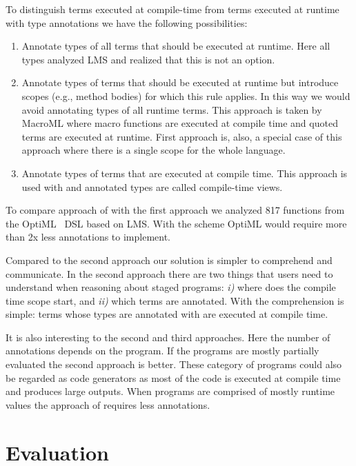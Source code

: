 To distinguish terms executed at compile-time from terms executed at runtime with type annotations we have the following possibilities:
\begin{enumerate}
\item Annotate types of all terms that should be executed at runtime. Here all types analyzed LMS and realized that this is not an option.

\item Annotate types of terms that should be executed at runtime but introduce scopes (e.g., method bodies) for which this rule applies.
In this way we would avoid annotating types of all runtime terms. This approach is taken by MacroML where
macro functions are executed at compile time and quoted terms are executed at runtime. First approach is, also,
a special case of this approach where there is a single scope for the whole language.

\item Annotate types of terms that are executed at compile time. This approach is used with \ct and annotated types are
called compile-time views.
\end{enumerate}

To compare approach of \ct with the first approach we analyzed 817 functions
from the OptiML~\cite{sujeeth_optiml:_2011} DSL based on LMS. With the \ct scheme
OptiML would require more than 2x less annotations to implement.

Compared to the second approach our solution is simpler to comprehend and communicate. In the second approach there are
two things that users need to understand when reasoning about staged programs: \emph{i)} where does
the compile time scope start, and \emph{ii)} which terms are annotated. With \ct the comprehension
is simple: terms whose types are annotated with  are executed at compile time.

It is also interesting to the second and third approaches. Here the number of annotations
depends on the program. If the programs are mostly partially evaluated the second approach
is better. These category of programs could also be regarded as code generators as most of the code
is executed at compile time and produces large outputs. When programs are comprised of mostly
runtime values the approach of \ct requires less annotations.


\section{Evaluation}
\label{sct:ct-evaluation}

